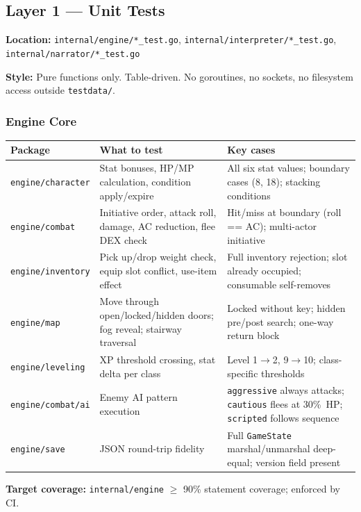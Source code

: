\documentclass[a4paper,10pt]{article}
\newcommand{\pkg}[1]{\texttt{#1}}
\begin{document}
\subsection{Layer 1 --- Unit Tests}

\textbf{Location:} \texttt{internal/engine/*\_test.go},
\texttt{internal/interpreter/*\_test.go},
\texttt{internal/narrator/*\_test.go}

\textbf{Style:} Pure functions only.  Table-driven.  No goroutines,
no sockets, no filesystem access outside \texttt{testdata/}.

\subsubsection{Engine Core}

\begin{center}
\begin{tabular}{lp{5cm}p{4cm}}
\toprule
\textbf{Package} & \textbf{What to test} & \textbf{Key cases} \\
\midrule
\pkg{engine/character}
  & Stat bonuses, HP/MP calculation, condition apply/expire
  & All six stat values; boundary cases (8, 18); stacking conditions \\
\pkg{engine/combat}
  & Initiative order, attack roll, damage, AC reduction, flee DEX check
  & Hit/miss at boundary (roll == AC); multi-actor initiative \\
\pkg{engine/inventory}
  & Pick up/drop weight check, equip slot conflict, use-item effect
  & Full inventory rejection; slot already occupied; consumable self-removes \\
\pkg{engine/map}
  & Move through open/locked/hidden doors; fog reveal; stairway traversal
  & Locked without key; hidden pre/post search; one-way return block \\
\pkg{engine/leveling}
  & XP threshold crossing, stat delta per class
  & Level 1$\to$2, 9$\to$10; class-specific thresholds \\
\pkg{engine/combat/ai}
  & Enemy AI pattern execution
  & \texttt{aggressive} always attacks; \texttt{cautious} flees at 30\%~HP; \texttt{scripted} follows sequence \\
\pkg{engine/save}
  & JSON round-trip fidelity
  & Full \texttt{GameState} marshal/unmarshal deep-equal; version field present \\
\bottomrule
\end{tabular}
\end{center}

\textbf{Target coverage:} \texttt{internal/engine} $\geq$ 90\%
statement coverage; enforced by CI.
\end{document}
